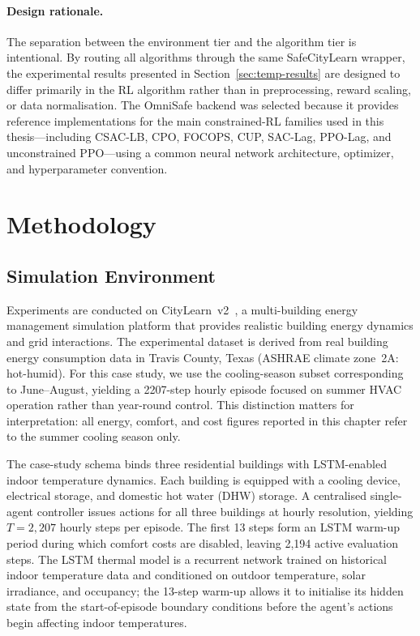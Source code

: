 \paragraph{Design rationale.}
The separation between the environment tier and the algorithm tier is
intentional.  By routing all algorithms through the same SafeCityLearn wrapper,
the experimental results presented in Section~\ref{sec:temp-results} are
designed to differ primarily in the RL algorithm rather than in preprocessing,
reward scaling, or data normalisation.  The OmniSafe backend was selected because it
provides reference implementations for the main constrained-RL families used in
this thesis---including CSAC-LB, CPO, FOCOPS, CUP, SAC-Lag, PPO-Lag, and
unconstrained PPO---using a common neural network architecture, optimizer, and
hyperparameter convention.


\section{Methodology}
\label{sec:temp-methodology}

\subsection{Simulation Environment}
\label{sec:temp-env}

Experiments are conducted on CityLearn~v2~\cite{nweye2023citylearn}, a
multi-building energy management simulation platform that provides realistic
building energy dynamics and grid interactions.  The experimental dataset is
derived from real building energy consumption data in Travis County, Texas
(ASHRAE climate zone~2A: hot-humid).  For this case study, we use the
cooling-season subset corresponding to June--August, yielding a
\num{2207}-step hourly episode focused on summer HVAC operation rather than
year-round control.  This distinction matters for interpretation: all energy,
comfort, and cost figures reported in this chapter refer to the summer
cooling season only.

The case-study schema binds three residential buildings with LSTM-enabled
indoor temperature dynamics.  Each building is equipped with a cooling device,
electrical storage, and domestic hot water (DHW) storage.  A centralised
single-agent controller issues actions for all three buildings at hourly
resolution, yielding $T = 2{,}207$ hourly steps per episode.  The first
13 steps form an LSTM warm-up period during which comfort costs are disabled,
leaving 2{,}194 active evaluation steps.
The LSTM thermal model is a recurrent network trained on historical indoor
temperature data and conditioned on outdoor temperature, solar irradiance, and
occupancy; the 13-step warm-up allows it to initialise its hidden state from
the start-of-episode boundary conditions before the agent's actions begin
affecting indoor temperatures.

